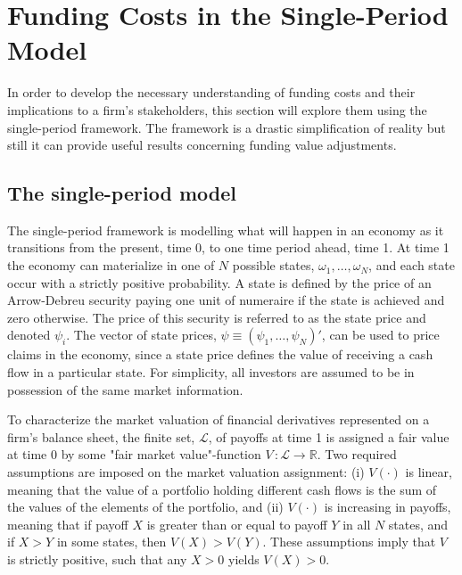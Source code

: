 \documentclass[main.tex]{subfiles}
\begin{document}
    \section{Funding Costs in the Single-Period Model}
        In order to develop the necessary understanding of funding costs and their implications to a firm's stakeholders, this section will explore them using the single-period framework.
        The framework is a drastic simplification of reality but still it can provide useful results concerning funding value adjustments.

    \subsection{The single-period model}
        The single-period framework is modelling what will happen in an economy as it transitions from the present, time 0, to one time period ahead, time 1.
        At time 1 the economy can materialize in one of $N$ possible states, $\omega_{1}, \dots, \omega_{N}$, and each state occur with a strictly positive probability.
        A state is defined by the price of an Arrow-Debreu security paying one unit of numeraire if the state is achieved and zero otherwise.
        The price of this security is referred to as the state price and denoted $\psi_{i}$.
        The vector of state prices, $\psi \equiv \left(\psi_{1}, \dots, \psi_{N}\right)'$, can be used to price claims in the economy, since a state price defines the value of receiving a cash flow in a particular state.
        For simplicity, all investors are assumed to be in possession of the same market information.

        To characterize the market valuation of financial derivatives represented on a firm's balance sheet, the finite set, $\mathcal{L}$, of payoffs at time 1 is assigned a fair value at time 0 by some "fair market value"-function $V\, \colon \mathcal{L} \rightarrow \mathbb{R}$.
        Two required assumptions are imposed on the market valuation assignment: 
        (i) $V(\cdot)$ is linear, meaning that the value of a portfolio holding different cash flows is the sum of the values of the elements of the portfolio, and 
        (ii) $V(\cdot)$ is increasing in payoffs, meaning that if payoff $X$ is greater than or equal to payoff $Y$ in all $N$ states, and if $X>Y$ in some states, then $V(X)>V(Y)$.
        These assumptions imply that $V$ is strictly positive, such that any $X>0$ yields $V(X) > 0$.
        
\end{document}
